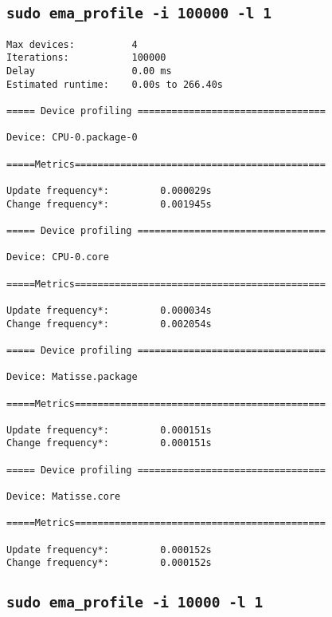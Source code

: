 \clearpage
\subsection*{\texttt{sudo ema\_profile -i 100000 -l 1}}

\begin{verbatim}
Max devices:          4
Iterations:           100000
Delay                 0.00 ms
Estimated runtime:    0.00s to 266.40s

===== Device profiling =================================

Device: CPU-0.package-0

=====Metrics============================================

Update frequency*:         0.000029s
Change frequency*:         0.001945s

===== Device profiling =================================

Device: CPU-0.core

=====Metrics============================================

Update frequency*:         0.000034s
Change frequency*:         0.002054s

===== Device profiling =================================

Device: Matisse.package

=====Metrics============================================

Update frequency*:         0.000151s
Change frequency*:         0.000151s

===== Device profiling =================================

Device: Matisse.core

=====Metrics============================================

Update frequency*:         0.000152s
Change frequency*:         0.000152s
\end{verbatim}

\clearpage
\subsection*{\texttt{sudo ema\_profile -i 10000 -l 1}}

